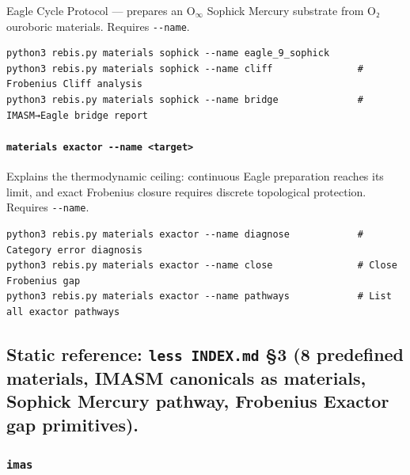 Eagle Cycle Protocol --- prepares an \(\text{O}_{\infty}\) Sophick
Mercury substrate from O₂ ouroboric materials. Requires
\texttt{-\/-name}.

\begin{verbatim}
python3 rebis.py materials sophick --name eagle_9_sophick
python3 rebis.py materials sophick --name cliff               # Frobenius Cliff analysis
python3 rebis.py materials sophick --name bridge              # IMASM→Eagle bridge report
\end{verbatim}

\hypertarget{materials-exactor---name-target}{%
\paragraph{\texorpdfstring{\texttt{materials\ exactor\ -\/-name\ \textless{}target\textgreater{}}}{materials exactor -\/-name \textless target\textgreater{}}}\label{materials-exactor---name-target}}

Explains the thermodynamic ceiling: continuous Eagle preparation reaches
its limit, and exact Frobenius closure requires discrete topological
protection. Requires \texttt{-\/-name}.

\begin{verbatim}
python3 rebis.py materials exactor --name diagnose            # Category error diagnosis
python3 rebis.py materials exactor --name close               # Close Frobenius gap
python3 rebis.py materials exactor --name pathways            # List all exactor pathways
\end{verbatim}

\hypertarget{static-reference-less-index.md-3-8-predefined-materials-imasm-canonicals-as-materials-sophick-mercury-pathway-frobenius-exactor-gap-primitives.}{%
\subsection{\texorpdfstring{\textbf{Static reference:}
\texttt{less\ INDEX.md} §3 (8 predefined materials, IMASM canonicals as
materials, Sophick Mercury pathway, Frobenius Exactor gap
primitives).}{Static reference: less INDEX.md §3 (8 predefined materials, IMASM canonicals as materials, Sophick Mercury pathway, Frobenius Exactor gap primitives).}}\label{static-reference-less-index.md-3-8-predefined-materials-imasm-canonicals-as-materials-sophick-mercury-pathway-frobenius-exactor-gap-primitives.}}

\hypertarget{imas}{%
\subsubsection{\texorpdfstring{\texttt{imas}}{imas}}\label{imas}}

